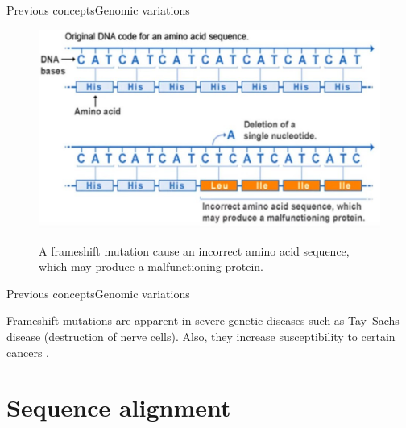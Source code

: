 \documentclass[10pt]{beamer}
\begin{document}
{%
\begin{frame}{Previous concepts}{Genomic variations}
	\begin{figure}[]
		\centering
		\includegraphics[width=\textwidth,height=0.6\textheight,keepaspectratio]{img/alignment/mut.jpg}
		\label{img:alig}
		\caption{A frameshift mutation cause an incorrect amino acid sequence, which may produce a malfunctioning protein.}
	\end{figure}
\end{frame}

\begin{frame}{Previous concepts}{Genomic variations}
	\begin{block}{}
		Frameshift mutations are apparent in severe genetic diseases such as Tay–Sachs disease (destruction of nerve cells). Also, they increase susceptibility to certain cancers \cite{zimmerman1997inherited}.
	\end{block}
	
\end{frame}

\section{Sequence alignment}

}
\end{document}
